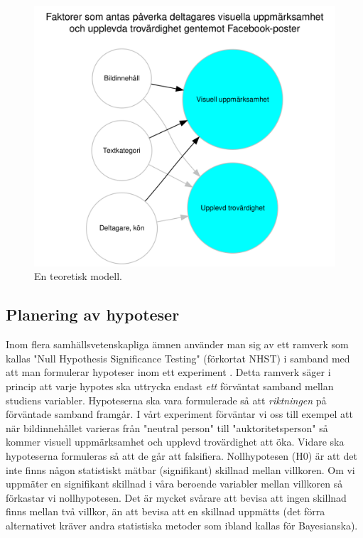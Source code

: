 \documentclass[
]{book}
\begin{document}
\begin{figure}

{\centering \includegraphics[width=0.8\linewidth]{../fig/graph} 

}

\caption{En teoretisk modell.}\label{fig:fig-02-06-3-0-01}
\end{figure}

\hypertarget{sub06.3.1}{%
\subsection{Planering av hypoteser}\label{sub06.3.1}}

Inom flera samhällsvetenskapliga ämnen använder man sig av ett ramverk som kallas "Null Hypothesis Significance Testing" (förkortat NHST) i samband med att man formulerar hypoteser inom ett experiment \citep{pernet2015null}. Detta ramverk säger i princip att varje hypotes ska uttrycka endast \emph{ett} förväntat samband mellan studiens variabler. Hypoteserna ska vara formulerade så att \emph{riktningen} på förväntade samband framgår. I vårt experiment förväntar vi oss till exempel att när bildinnehållet varieras från "neutral person" till "auktoritetsperson" så kommer visuell uppmärksamhet och upplevd trovärdighet att öka. Vidare ska hypoteserna formuleras så att de går att falsifiera. Nollhypotesen (H0) är att det inte finns någon statistiskt mätbar (signifikant) skillnad mellan villkoren. Om vi uppmäter en signifikant skillnad i våra beroende variabler mellan villkoren så förkastar vi nollhypotesen. Det är mycket svårare att bevisa att ingen skillnad finns mellan två villkor, än att bevisa att en skillnad uppmätts (det förra alternativet kräver andra statistiska metoder som ibland kallas för Bayesianska).
\end{document}
